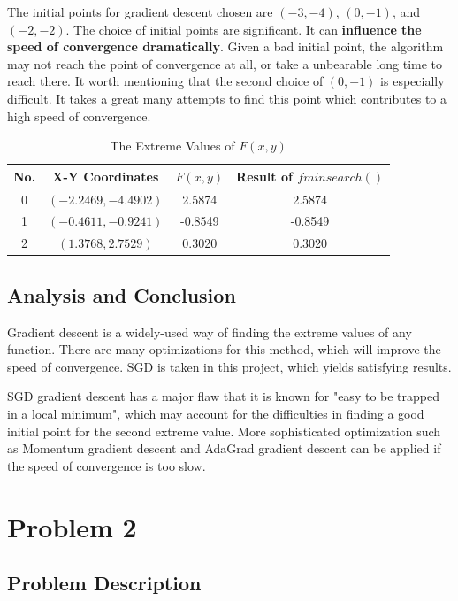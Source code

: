 \documentclass[12pt]{article}
\begin{document}
The initial points for gradient descent chosen are $(-3,-4)$, $(0,-1)$, and $(-2,-2)$. The choice of initial points are significant. It can \textbf{influence the speed of convergence dramatically}. Given a bad initial point, the algorithm may not reach the point of convergence at all, or take a unbearable long time to reach there. It worth mentioning that the second choice of $(0,-1)$ is especially difficult. It takes a great many attempts to find this point which contributes to a high speed of convergence.


\begin{table}[h]
	\caption{The Extreme Values of $F(x,y)$}
	\begin{center}
		\begin{tabular}{|c|c|c|c|}
			\hline
			No. & X-Y Coordinates & $F(x,y)$ & Result of $fminsearch()$ \\ \hline
			0 & $(-2.2469,-4.4902)$ & 2.5874 &  2.5874 \\ \hline
			1 & $(-0.4611,-0.9241)$ & -0.8549 & -0.8549 \\ \hline
			2 & $(1.3768,2.7529)$ & 0.3020 & 0.3020 \\ \hline
		\end{tabular}
	\end{center}
	\label{table:p1result}
\end{table}

\subsection{Analysis and Conclusion}   
  

Gradient descent is a widely-used way of finding the extreme values of any function. There are many optimizations for this method, which will improve the speed of convergence. SGD is taken in this project, which yields satisfying results.

SGD gradient descent has a major flaw that it is known for "easy to be trapped in a local minimum", which may account for the difficulties in finding a good initial point for the second extreme value. More sophisticated optimization such as Momentum gradient descent and AdaGrad gradient descent can be applied if the speed of convergence is too slow.


\section{Problem 2}

\subsection{Problem Description}
\end{document}
